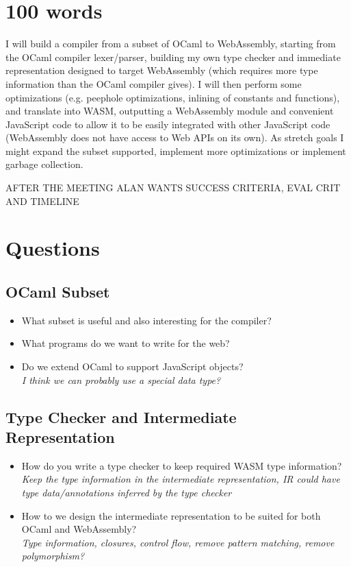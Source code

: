 \documentclass{article}
\title{\thetitle}
\author{Paul Durbaba}
\begin{document}
\maketitle
\section{100 words}

I will build a compiler from a subset of OCaml to WebAssembly, starting from the OCaml compiler lexer/parser, building my own type checker and immediate representation designed to target WebAssembly (which requires more type information than the OCaml compiler gives). I will then perform some optimizations (e.g. peephole optimizations, inlining of constants and functions), and translate into WASM, outputting a WebAssembly module and convenient JavaScript code to allow it to be easily integrated with other JavaScript code (WebAssembly does not have access to Web APIs on its own). As stretch goals I might expand the subset supported, implement more optimizations or implement garbage collection.

AFTER THE MEETING ALAN WANTS SUCCESS CRITERIA, EVAL CRIT AND TIMELINE

\section{Questions}

\subsection{OCaml Subset}
\begin{itemize}
\item What subset is useful and also interesting for the compiler?
\item What programs do we want to write for the web?
\item Do we extend OCaml to support JavaScript objects?
      \\ \textit{I think we can probably use a special data type?}
\end{itemize}

\subsection{Type Checker and Intermediate Representation}
\begin{itemize}
\item How do you write a type checker to keep required WASM type information?
      \\ \textit{Keep the type information in the intermediate representation, IR could have type data/annotations inferred by the type checker}
\item How to we design the intermediate representation to be suited for both OCaml and WebAssembly?
      \\ \textit{Type information, closures, control flow, remove pattern matching, remove polymorphism?}
\end{itemize}
\end{document}
